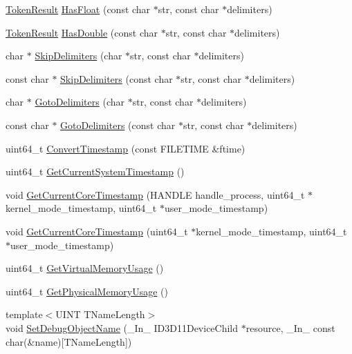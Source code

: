 \begin{DoxyCompactItemize}
\item 
\hyperlink{namespacemage_a2178ba2411db5912f41b2e7698c2037d}{Token\+Result} \hyperlink{namespacemage_a8ebb1c7757b2869a4d3dc3c60c3a836d}{Has\+Float} (const char $\ast$str, const char $\ast$delimiters)
\item 
\hyperlink{namespacemage_a2178ba2411db5912f41b2e7698c2037d}{Token\+Result} \hyperlink{namespacemage_ac039d6b5a481b26e7440672a75ad70df}{Has\+Double} (const char $\ast$str, const char $\ast$delimiters)
\item 
char $\ast$ \hyperlink{namespacemage_a0a49375006b3808200d86271f62dbbc2}{Skip\+Delimiters} (char $\ast$str, const char $\ast$delimiters)
\item 
const char $\ast$ \hyperlink{namespacemage_acd903800f144d88982aa559730b9a165}{Skip\+Delimiters} (const char $\ast$str, const char $\ast$delimiters)
\item 
char $\ast$ \hyperlink{namespacemage_a1f8c73ddfbe8a370be1800627136b2ca}{Goto\+Delimiters} (char $\ast$str, const char $\ast$delimiters)
\item 
const char $\ast$ \hyperlink{namespacemage_a3cbc104feb30a9abd8dcec1a77b918b0}{Goto\+Delimiters} (const char $\ast$str, const char $\ast$delimiters)
\item 
uint64\+\_\+t \hyperlink{namespacemage_a75f2f48306b962f530412769c6187aa5}{Convert\+Timestamp} (const F\+I\+L\+E\+T\+I\+ME \&ftime)
\item 
uint64\+\_\+t \hyperlink{namespacemage_aeea6f9a0100878bc2403d41ea6d5ac08}{Get\+Current\+System\+Timestamp} ()
\item 
void \hyperlink{namespacemage_a1c830fb0bc11bc1f71585a4dad01c1db}{Get\+Current\+Core\+Timestamp} (H\+A\+N\+D\+LE handle\+\_\+process, uint64\+\_\+t $\ast$kernel\+\_\+mode\+\_\+timestamp, uint64\+\_\+t $\ast$user\+\_\+mode\+\_\+timestamp)
\item 
void \hyperlink{namespacemage_ab13eacb27032f7167e735b0f4f6960fc}{Get\+Current\+Core\+Timestamp} (uint64\+\_\+t $\ast$kernel\+\_\+mode\+\_\+timestamp, uint64\+\_\+t $\ast$user\+\_\+mode\+\_\+timestamp)
\item 
uint64\+\_\+t \hyperlink{namespacemage_abc4bbe41e0b34bb80ff8994ec09bd2bf}{Get\+Virtual\+Memory\+Usage} ()
\item 
uint64\+\_\+t \hyperlink{namespacemage_ad86bf56ff188b6519ddc0f0df8eaac20}{Get\+Physical\+Memory\+Usage} ()
\item 
{\footnotesize template$<$U\+I\+NT T\+Name\+Length$>$ }\\void \hyperlink{namespacemage_a88833e1a7c6ad614ff6e88cb10eff532}{Set\+Debug\+Object\+Name} (\+\_\+\+In\+\_\+ I\+D3\+D11\+Device\+Child $\ast$resource, \+\_\+\+In\+\_\+ const char(\&name)\mbox{[}T\+Name\+Length\mbox{]})

\end{DoxyCompactItemize}
